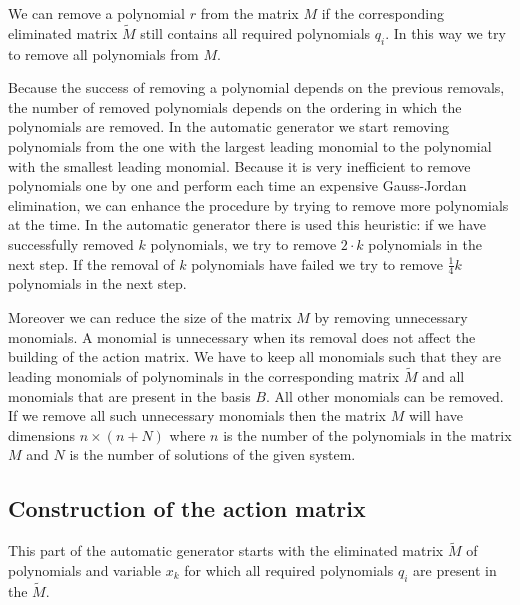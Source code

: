 We can remove a polynomial $r$ from the matrix $M$ if the corresponding eliminated matrix $\tilde{M}$ still contains all required polynomials $q_i$. In this way we try to remove all polynomials from $M$.

Because the success of removing a polynomial depends on the previous removals, the number of removed polynomials depends on the ordering in which the polynomials are removed. In the automatic generator we start removing polynomials from the one with the largest leading monomial to the polynomial with the smallest leading monomial. Because it is very inefficient to remove polynomials one by one and perform each time an expensive Gauss-Jordan elimination, we can enhance the procedure by trying to remove more polynomials at the time. In the automatic generator there is used this heuristic: if we have successfully removed $k$ polynomials, we try to remove $2\cdot k$ polynomials in the next step. If the removal of $k$ polynomials have failed we try to remove $\frac{1}{4}k$ polynomials in the next step.

Moreover we can reduce the size of the matrix $M$ by removing unnecessary monomials. A monomial is unnecessary when its removal does not affect the building of the action matrix. We have to keep all monomials such that they are leading monomials of polynominals in the corresponding matrix $\tilde{M}$ and all monomials that are present in the basis $B$. All other monomials can be removed. If we remove all such unnecessary monomials then the matrix $M$ will have dimensions $n \times (n + N)$ where $n$ is the number of the polynomials in the matrix $M$ and $N$ is the number of solutions of the given system.

\subsection{Construction of the action matrix}
This part of the automatic generator starts with the eliminated matrix $\tilde{M}$ of polynomials and variable $x_k$ for which all required polynomials $q_i$ are present in the $\tilde{M}$.

